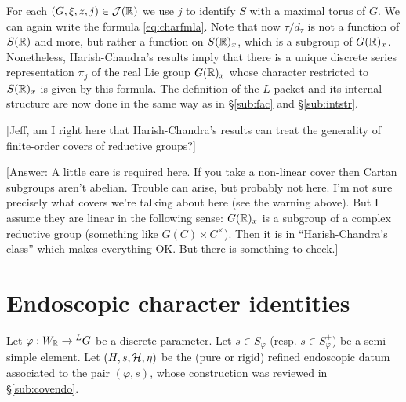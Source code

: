 \documentclass{article}
\theoremstyle{definition}
\numberwithin{equation}{section}
\renewcommand{\-}{\hyp{}}
\newcommand{\warn}[1]{{\leavevmode\color{red}[#1]}}
\begin{document}
For each $(G,\xi,z,j) \in \mathcal{J}(\mathbb{R})$ we use $j$ to identify $S$ with a maximal torus of $G$. We can again write the formula \eqref{eq:charfmla}. Note that now $\tau/d_\tau$ is not a function of $S(\mathbb{R})$ and more, but rather a function on $S(\mathbb{R})_x$, which is a subgroup of $G(\mathbb{R})_x$. Nonetheless, Harish-Chandra's results imply that there is a unique discrete series representation $\pi_j$ of the real Lie group $G(\mathbb{R})_x$ whose character restricted to $S(\mathbb{R})_x$ is given by this formula. The definition of the $L$-packet and its internal structure are now done in the same way as in \S\ref{sub:fac} and \S\ref{sub:intstr}.

\warn{Jeff, am I right here that Harish-Chandra's results can treat the generality of finite-order covers of reductive groups?}

\warn{Answer: A little care is required here. If you take a non-linear cover then Cartan subgroups aren't abelian. Trouble can arise, but probably not here.
I'm not sure precisely what covers we're talking about here (see the warning above). But I assume they are linear in the following sense:
$G(\mathbb{R})_x$ is a   subgroup of a complex reductive group (something like $G(C)\times C^\times$). Then it is in ``Harish-Chandra's class'' which makes everything OK.
  But there is something to check.}


\section{Endoscopic character identities} \label{sec:endo}

Let $\varphi : W_{\mathbb{R}} \to {^LG}$ be a discrete parameter. Let $s \in S_\varphi$ (resp. $s \in S_\varphi^+$) be a semi-simple element. Let $(H,s,\mathcal{H},\eta)$ be the (pure or rigid) refined endoscopic datum associated to the pair $(\varphi,s)$, whose construction was reviewed in \S\ref{sub:covendo}.



\end{document}
